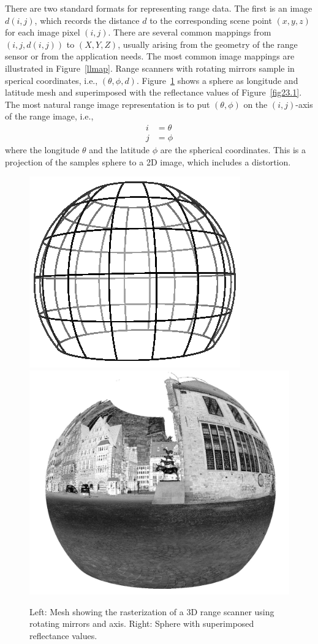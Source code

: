 \documentclass[twocolumn,oneside]{book}
\begin{document}
There are two standard formats for representing range data.  The first
is an image $d(i,j)$, which records the distance $d$ to the
corresponding scene point $(x,y,z)$ for each image pixel $(i,j)$.
There are several common mappings from $(i,j,d(i,j))$ to $(X,Y,Z)$,
usually arising from the geometry of the range sensor or from the
application needs. The most common image mappings are illustrated in
Figure~\ref{llmap}. Range scanners with rotating mirrors sample in
sperical coordinates, i.e., $(\theta,\phi,d)$. Figure~\ref{sphere}
shows a sphere as longitude and latitude mesh and superimposed with
the reflectance values of Figure~\ref{fig23.1}. The most natural
range image representation is to put $(\theta,\phi)$ on the
$(i,j)$-axis of the range image, i.e.,
\begin{align*}
 i & = \theta \\
 j & = \phi
\end{align*}  
where the longitude $\theta$ and the latitude $\phi$ are the spherical
coordinates. This is a projection of the samples sphere to a 2D
image, which includes a distortion.
%
\begin{figure}
  \includegraphics[width=0.485\linewidth]{BOOKFIGS/partial-sphere}
  \includegraphics[width=0.485\linewidth]{BOOKFIGS/scan007_sphere}
  \caption{Left: Mesh showing the rasterization of a 3D range scanner
    using rotating mirrors and axis. Right: Sphere with superimposed
    reflectance values.}
\label{sphere}
\end{figure}
\end{document}
